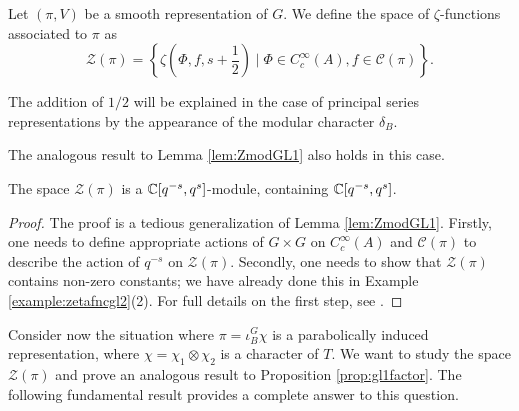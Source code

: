 \iffalse
\textbf{This would be a good point to introduce a few examples. Ideas:
\begin{enumerate}
    \item Explicit computation of some zeta functions associated to the character $\det$ or $\phi\circ\det$. This requires, however, the cartan decomposition, which is not here yet.
    \item Explicit computation that $\mathcal{Z}(\pi)$ contains a non-zero constant. This would be an explicit step of the proof of Lemma \ref{lem:ZmodGL2}. If we do this, should we just prove the lemma as a whole?
\end{enumerate}
}
\fi

\begin{defn}
    Let $(\pi,V)$ be a smooth representation of $G$. We define the space of $\zeta$-functions associated to $\pi$ as $$\mathcal Z(\pi) = \left\{\zeta\left(\Phi,f,s+\frac{1}{2}\right) \mid \Phi \in C_c^\infty(A), f \in \mathcal C(\pi)\right\}.$$
\end{defn}
\begin{rem}
    The addition of $1/2$ will be explained in the case of principal series representations by the appearance of the modular character $\delta_B$.
\end{rem}

The analogous result to Lemma \ref{lem:ZmodGL1} also holds in this case.

\begin{lemma}\label{lem:ZmodGL2}
    The space $\mathcal Z(\pi)$ is a $\mathbb{C}[q^{-s},q^s]$-module, containing $\mathbb{C}[q^{-s},q^s]$.
\end{lemma}
\begin{proof}
    The proof is a tedious generalization of Lemma \ref{lem:ZmodGL1}. Firstly, one needs to define appropriate actions of $G\times G$ on $C_c^\infty(A)$ and $\mathcal{C}(\pi)$ to describe the action of $q^{-s}$ on $\mathcal{Z}(\pi)$. Secondly, one needs to show that $\mathcal{Z}(\pi)$ contains non-zero constants; we have already done this in Example \ref{example:zetafncgl2}(2). For full details on the first step, see
    \cite[Lemma 24.4.2]{BH1}.
\end{proof}


Consider now the situation where $\pi = \iota_B^G \chi$ is a parabolically induced representation, where $\chi = \chi_1 \otimes \chi_2$ is a character of $T$. We want to study the space $\mathcal Z(\pi)$ and prove an analogous result to Proposition \ref{prop:gl1factor}. The following fundamental result provides a complete answer to this question.



